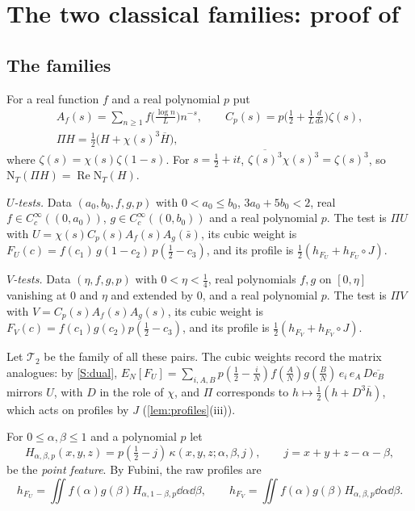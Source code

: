 \documentclass[11pt,colorlinks]{charlie}
\begin{document}
\section{The two classical families: proof of }\label{sec:twofamily}

\subsection{The families}
For a real function $f$ and a real polynomial $p$ put
\begin{gather*}
 A_f(s)=\sum_{n\ge1}f\Big(\frac{\log n}{L}\Big)n^{-s},\qquad
 C_p(s)=p\Big(\frac12+\frac1L\frac{d}{ds}\Big)\zeta(s),\\
 \Pi H=\tfrac12\big(H+\chi(s)^3\overline H\big),
\end{gather*}
where $\zeta(s)=\chi(s)\zeta(1-s)$. For $s=\frac12+it$, $\overline{\zeta(s)^3}\chi(s)^3=\zeta(s)^3$, so $\mathrm N_T(\Pi H)=\operatorname{Re}\mathrm N_T(H)$.

\emph{$U$-tests.} Data $(a_0,b_0,f,g,p)$ with $0<a_0\le b_0$, $3a_0+5b_0<2$, real $f\in C_c^\infty((0,a_0))$, $g\in C_c^\infty((0,b_0))$ and a real polynomial $p$. The test is $\Pi U$ with $U=\chi(s)C_p(s)A_f(s)A_g(\bar s)$, its cubic weight is $F_U(c)=f(c_1)\,g(1-c_2)\,p(\tfrac12-c_3)$, and its profile is $\frac12(h_{F_U}+h_{F_U}\circ J)$.

\emph{$V$-tests.} Data $(\eta,f,g,p)$ with $0<\eta<\frac14$, real polynomials $f,g$ on $[0,\eta]$ vanishing at $0$ and $\eta$ and extended by $0$, and a real polynomial $p$. The test is $\Pi V$ with $V=C_p(s)A_f(s)A_g(s)$, its cubic weight is $F_V(c)=f(c_1)g(c_2)p(\tfrac12-c_3)$, and its profile is $\frac12(h_{F_V}+h_{F_V}\circ J)$.

Let $\mathcal T_2$ be the family of all these pairs. The cubic weights record the matrix analogues: by \ref{S:dual}, $E_N[F_U]=\sum_{i,A,B}p(\tfrac12-\tfrac iN)f(\tfrac AN)g(\tfrac BN)\,e_i\,e_A\,D\overline{e_B}$ mirrors $U$, with $D$ in the role of $\chi$, and $\Pi$ corresponds to $h\mapsto\frac12(h+D^3\overline h)$, which acts on profiles by $J$ (\cref{lem:profiles}(iii)).

For $0\le\alpha,\beta\le1$ and a polynomial $p$ let
\[
 H_{\alpha,\beta,p}(x,y,z)=p(\tfrac12-j)\,\kappa(x,y,z;\alpha,\beta,j),\qquad j=x+y+z-\alpha-\beta,
\]
be the \emph{point feature}. By Fubini, the raw profiles are
\[
 h_{F_U}=\iint f(\alpha)g(\beta)H_{\alpha,1-\beta,p}\dd\alpha\dd\beta,\qquad h_{F_V}=\iint f(\alpha)g(\beta)H_{\alpha,\beta,p}\dd\alpha\dd\beta.
\]
\end{document}
